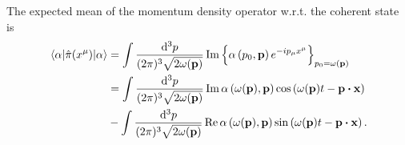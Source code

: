 \begin{lemma}\label{thm:qkg_coherent_momentum_density_mean}
	The expected mean of the momentum density operator w.r.t. the coherent state is
	\begin{equation}
		\begin{split}
			\expval{\hat\pi(x^\mu)}{\alpha}
			&=
			\int\frac{\dd[3]{p}}{(2\pi)^3\sqrt{2\omega(\vb{p})}}
			\Im\left\{
				\alpha\left(p_0,\vb{p}\right)
				e^{-ip_\mu x^\mu}	
			\right\}_{p_0=\omega(\vb{p})}
			\\
			&=
			\int\frac{\dd[3]{p}}{(2\pi)^3\sqrt{2\omega(\vb{p})}}
			\Im\alpha\left(\omega(\vb{p}),\vb{p}\right)
			\cos\left(\omega(\vb{p})t-\vb{p}\vdot\vb{x}\right)
			\\
			&-
			\int\frac{\dd[3]{p}}{(2\pi)^3\sqrt{2\omega(\vb{p})}}
			\Re\alpha\left(\omega(\vb{p}),\vb{p}\right)
			\sin\left(\omega(\vb{p})t-\vb{p}\vdot\vb{x}\right)
			.
		\end{split}
	\end{equation}
\end{lemma}
